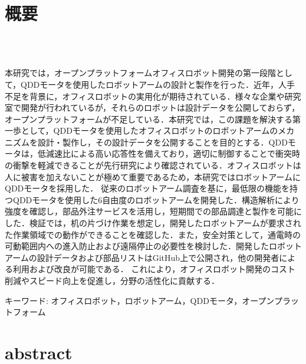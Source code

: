 \chapter*{概要}
\thispagestyle{empty}
%
\begin{center}
  \scalebox{1.5}{オープンプラットフォームオフィスロボットの開発}\\
  \scalebox{1.2}{-QDDモータを使用したロボットアームのメカニズムの設計と製作-}\\
\end{center}
\vspace{1.0zh}
%

本研究では，オープンプラットフォームオフィスロボット開発の第一段階として，QDDモータを使用したロボットアームの設計と製作を行った．近年，人手不足を背景に，オフィスロボットの実用化が期待されている．様々な企業や研究室で開発が行われているが，それらのロボットは設計データを公開しておらず，オープンプラットフォームが不足している．本研究では，この課題を解決する第一歩として，QDDモータを使用したオフィスロボットのロボットアームのメカニズムを設計・製作し，その設計データを公開することを目的とする．QDDモータは，低減速比による高い応答性を備えており，適切に制御することで衝突時の衝撃を軽減できることが先行研究により確認されている．オフィスロボットは人に被害を加えないことが極めて重要であるため，本研究ではロボットアームにQDDモータを採用した．
従来のロボットアーム調査を基に，最低限の機能を持つQDDモータを使用した6自由度のロボットアームを開発した．構造解析により強度を確認し，部品外注サービスを活用し，短期間での部品調達と製作を可能にした．検証では，机の片づけ作業を想定し，開発したロボットアームが要求された作業領域での動作ができることを確認した．また，安全対策として，通電時の可動範囲内への進入防止および遠隔停止の必要性を検討した．開発したロボットアームの設計データおよび部品リストはGitHub上で公開され，他の開発者による利用および改良が可能である．
これにより，オフィスロボット開発のコスト削減やスピード向上を促進し，分野の活性化に貢献する．


キーワード: オフィスロボット，ロボットアーム，QDDモータ，オープンプラットフォーム
%
\newpage
\chapter*{abstract}
\thispagestyle{empty}
%
%

